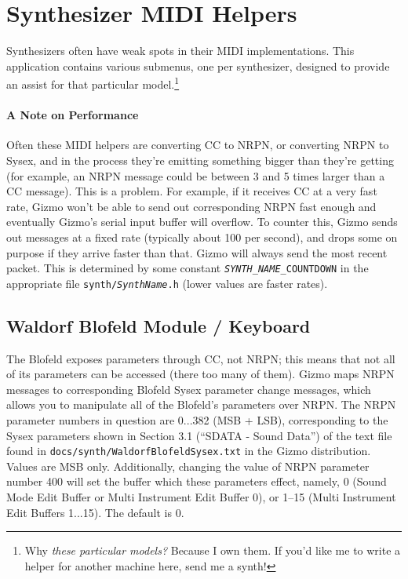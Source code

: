 \documentclass{article}
\begin{document}
\clearpage
\section {Synthesizer MIDI Helpers}
\label{synthesizer}

Synthesizers often have weak spots in their MIDI implementations.  This application contains various submenus, one per synthesizer, designed to provide an assist for that particular model.\footnote{Why {\it these particular models?}  Because I own them. If you'd like me to write a helper for another machine here, send me a synth!}

\paragraph{A Note on Performance} Often these MIDI helpers are converting CC to NRPN, or converting NRPN to Sysex, and in the process they're emitting something bigger than they're getting (for example, an NRPN message could be between 3 and 5 times larger than a CC message).  This is a problem.  For example, if it receives CC at a very fast rate, Gizmo won't be able to send out corresponding NRPN fast enough and eventually Gizmo's serial input buffer will overflow.  To counter this, Gizmo sends out messages at a fixed rate (typically about 100 per second), and drops some on purpose if they arrive faster than that.   Gizmo will always send the most recent packet.  This is determined by some constant \texttt{\textit{SYNTH\_NAME}\_COUNTDOWN} in the appropriate file \texttt{synth/\textit{SynthName}.h} (lower values are faster rates).


\subsection{Waldorf Blofeld Module / Keyboard}  The Blofeld exposes parameters through CC, not NRPN; this means that not all of its parameters can be accessed (there too many of them).  Gizmo maps NRPN messages to corresponding Blofeld Sysex parameter change messages, which allows you to manipulate all of the Blofeld's parameters over NRPN.  The NRPN parameter numbers in question are 0...382 (MSB + LSB), corresponding to the Sysex parameters shown in Section 3.1 (``SDATA - Sound Data'') of the text file found in \texttt{docs/synth/WaldorfBlofeldSysex.txt} in the Gizmo distribution.  Values are MSB only.  Additionally, changing the value of NRPN parameter number 400 will set the buffer which these parameters effect, namely, 0 (Sound Mode Edit Buffer or Multi Instrument Edit Buffer 0), or 1--15 (Multi Instrument Edit Buffers 1...15).  The default is 0.
\end{document}
